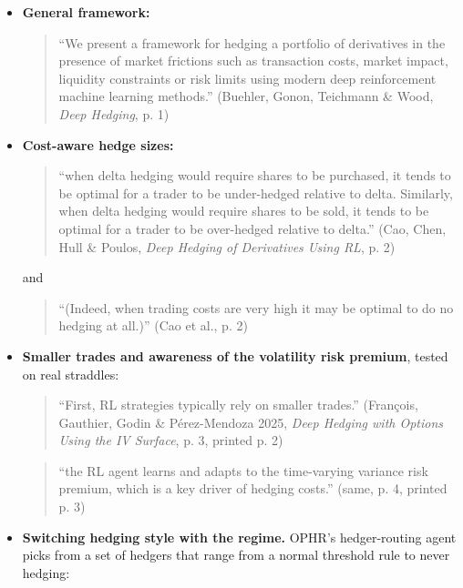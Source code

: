 \documentclass{article}
\begin{document}
\begin{itemize}

\item \textbf{General framework:}

\begin{quote}``We present a framework for hedging a portfolio of derivatives in the presence of market frictions such as transaction costs, market impact, liquidity constraints or risk limits using modern deep reinforcement machine learning methods.'' (Buehler, Gonon, Teichmann \& Wood, \emph{Deep Hedging}, p. 1)\end{quote}

\item \textbf{Cost-aware hedge sizes:}

\begin{quote}``when delta hedging would require shares to be purchased, it tends to be optimal for a trader to be under-hedged relative to delta. Similarly, when delta hedging would require shares to be sold, it tends to be optimal for a trader to be over-hedged relative to delta.'' (Cao, Chen, Hull \& Poulos, \emph{Deep Hedging of Derivatives Using RL}, p. 2)\end{quote}

and

\begin{quote}``(Indeed, when trading costs are very high it may be optimal to do no hedging at all.)'' (Cao et al., p. 2)\end{quote}

\item \textbf{Smaller trades and awareness of the volatility risk premium}, tested on real straddles:

\begin{quote}``First, RL strategies typically rely on smaller trades.'' (François, Gauthier, Godin \& Pérez-Mendoza 2025, \emph{Deep Hedging with Options Using the IV Surface}, p. 3, printed p. 2)\end{quote}

\begin{quote}``the RL agent learns and adapts to the time-varying variance risk premium, which is a key driver of hedging costs.'' (same, p. 4, printed p. 3)\end{quote}

\item \textbf{Switching hedging style with the regime.} OPHR's hedger-routing agent picks from a set of hedgers that range from a normal threshold rule to never hedging:


\end{itemize}
\end{document}
